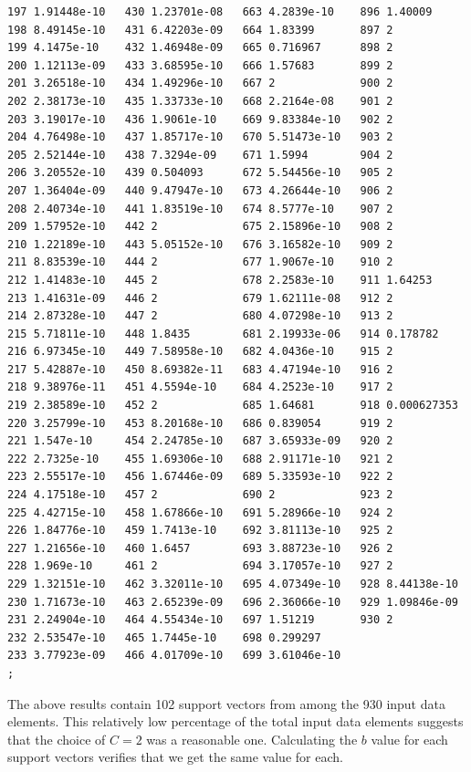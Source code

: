 \documentclass{article}
\begin{document}
\begin{verbatim}
197 1.91448e-10   430 1.23701e-08   663 4.2839e-10    896 1.40009
198 8.49145e-10   431 6.42203e-09   664 1.83399       897 2
199 4.1475e-10    432 1.46948e-09   665 0.716967      898 2
200 1.12113e-09   433 3.68595e-10   666 1.57683       899 2
201 3.26518e-10   434 1.49296e-10   667 2             900 2
202 2.38173e-10   435 1.33733e-10   668 2.2164e-08    901 2
203 3.19017e-10   436 1.9061e-10    669 9.83384e-10   902 2
204 4.76498e-10   437 1.85717e-10   670 5.51473e-10   903 2
205 2.52144e-10   438 7.3294e-09    671 1.5994        904 2
206 3.20552e-10   439 0.504093      672 5.54456e-10   905 2
207 1.36404e-09   440 9.47947e-10   673 4.26644e-10   906 2
208 2.40734e-10   441 1.83519e-10   674 8.5777e-10    907 2
209 1.57952e-10   442 2             675 2.15896e-10   908 2
210 1.22189e-10   443 5.05152e-10   676 3.16582e-10   909 2
211 8.83539e-10   444 2             677 1.9067e-10    910 2
212 1.41483e-10   445 2             678 2.2583e-10    911 1.64253
213 1.41631e-09   446 2             679 1.62111e-08   912 2
214 2.87328e-10   447 2             680 4.07298e-10   913 2
215 5.71811e-10   448 1.8435        681 2.19933e-06   914 0.178782
216 6.97345e-10   449 7.58958e-10   682 4.0436e-10    915 2
217 5.42887e-10   450 8.69382e-11   683 4.47194e-10   916 2
218 9.38976e-11   451 4.5594e-10    684 4.2523e-10    917 2
219 2.38589e-10   452 2             685 1.64681       918 0.000627353
220 3.25799e-10   453 8.20168e-10   686 0.839054      919 2
221 1.547e-10     454 2.24785e-10   687 3.65933e-09   920 2
222 2.7325e-10    455 1.69306e-10   688 2.91171e-10   921 2
223 2.55517e-10   456 1.67446e-09   689 5.33593e-10   922 2
224 4.17518e-10   457 2             690 2             923 2
225 4.42715e-10   458 1.67866e-10   691 5.28966e-10   924 2
226 1.84776e-10   459 1.7413e-10    692 3.81113e-10   925 2
227 1.21656e-10   460 1.6457        693 3.88723e-10   926 2
228 1.969e-10     461 2             694 3.17057e-10   927 2
229 1.32151e-10   462 3.32011e-10   695 4.07349e-10   928 8.44138e-10
230 1.71673e-10   463 2.65239e-09   696 2.36066e-10   929 1.09846e-09
231 2.24904e-10   464 4.55434e-10   697 1.51219       930 2
232 2.53547e-10   465 1.7445e-10    698 0.299297
233 3.77923e-09   466 4.01709e-10   699 3.61046e-10
;

\end{verbatim}

The above results contain 102 support vectors from among the 930 input data elements. This relatively low percentage of the total input data elements suggests that the choice of \(C=2\) was a reasonable one. Calculating the \(b\) value for each support vectors verifies that we get the same value for each.
\end{document}
